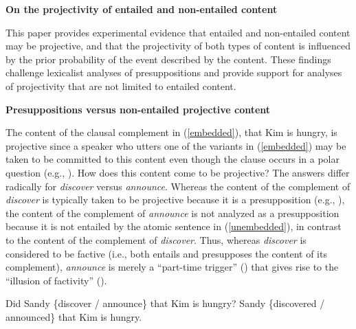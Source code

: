 \documentclass[12pt]{article}
\newcommand{\6}{\mbox{$[\hspace*{-.6mm}[$}}
\newcommand{\9}{\mbox{$]\hspace*{-.6mm}]$}}
\begin{document}
 
 
\begin{center}
{\large \bf On the projectivity of entailed and non-entailed content}
\end{center}

This paper provides experimental evidence that entailed and non-entailed content may be projective, and that the projectivity of both types of content is influenced by the prior probability of the event described by the content. These findings challenge lexicalist analyses of presuppositions and provide support for analyses of projectivity that are not limited to entailed content.

{\bf Presuppositions versus non-entailed projective content} 

The content of the clausal complement in (\ref{embedded}), that Kim is hungry, is projective since a speaker who utters one of the variants in (\ref{embedded}) may be taken to be committed to this content even though the clause occurs in a polar question (e.g., \citealt{ccmg90,brst-salt10}). How does this content come to be projective? The answers differ radically for {\em discover} versus {\em announce}. Whereas the content of the complement of {\em discover} is typically taken to be projective because it is a presupposition (e.g., \citealt{heim83,vds92}), the content of the complement of {\em announce} is not analyzed as a presupposition because it is not entailed by the atomic sentence in (\ref{unembedded}), in contrast to the content of the complement of {\em discover}. Thus, whereas {\em discover} is considered to be factive (i.e., both entails and presupposes the content of its complement), {\em announce} is merely a ``part-time trigger'' (\citealt[139]{schlenker10}) that gives rise to the ``illusion of factivity'' (\citealt[76]{anand-hacquard2014}).

\vspace*{-.2cm}
\begin{exe}
\ex
\begin{xlist}
\ex\label{embedded} Did Sandy \{discover / announce\} that Kim is hungry?
\ex\label{unembedded} Sandy \{discovered / announced\} that Kim is hungry.
\end{xlist}
\end{exe}
\vspace*{-.2cm}
\end{document}
